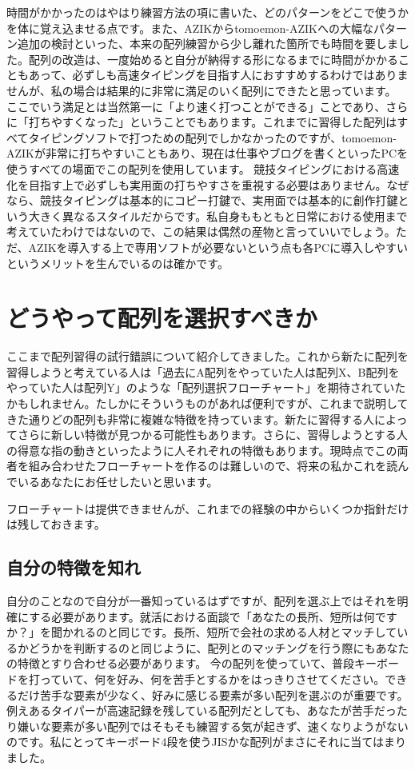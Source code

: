 時間がかかったのはやはり練習方法の項に書いた、どのパターンをどこで使うかを体に覚え込ませる点です。また、AZIKからtomoemon-AZIKへの大幅なパターン追加の検討といった、本来の配列練習から少し離れた箇所でも時間を要しました。配列の改造は、一度始めると自分が納得する形になるまでに時間がかかることもあって、必ずしも高速タイピングを目指す人におすすめするわけではありませんが、私の場合は結果的に非常に満足のいく配列にできたと思っています。
ここでいう満足とは当然第一に「より速く打つことができる」ことであり、さらに「打ちやすくなった」ということでもあります。これまでに習得した配列はすべてタイピングソフトで打つための配列でしかなかったのですが、tomoemon-AZIKが非常に打ちやすいこともあり、現在は仕事やブログを書くといったPCを使うすべての場面でこの配列を使用しています。
競技タイピングにおける高速化を目指す上で必ずしも実用面の打ちやすさを重視する必要はありません。なぜなら、競技タイピングは基本的にコピー打鍵で、実用面では基本的に創作打鍵という大きく異なるスタイルだからです。私自身ももともと日常における使用まで考えていたわけではないので、この結果は偶然の産物と言っていいでしょう。ただ、AZIKを導入する上で専用ソフトが必要ないという点も各PCに導入しやすいというメリットを生んでいるのは確かです。


\section{どうやって配列を選択すべきか}

ここまで配列習得の試行錯誤について紹介してきました。これから新たに配列を習得しようと考えている人は「過去にA配列をやっていた人は配列X、B配列をやっていた人は配列Y」のような「配列選択フローチャート」を期待されていたかもしれません。たしかにそういうものがあれば便利ですが、これまで説明してきた通りどの配列も非常に複雑な特徴を持っています。新たに習得する人によってさらに新しい特徴が見つかる可能性もあります。さらに、習得しようとする人の得意な指の動きといったように人それぞれの特徴もあります。現時点でこの両者を組み合わせたフローチャートを作るのは難しいので、将来の私かこれを読んでいるあなたにお任せしたいと思います。

フローチャートは提供できませんが、これまでの経験の中からいくつか指針だけは残しておきます。

\subsection{自分の特徴を知れ}

自分のことなので自分が一番知っているはずですが、配列を選ぶ上ではそれを明確にする必要があります。就活における面談で「あなたの長所、短所は何ですか？」を聞かれるのと同じです。長所、短所で会社の求める人材とマッチしているかどうかを判断するのと同じように、配列とのマッチングを行う際にもあなたの特徴とすり合わせる必要があります。
今の配列を使っていて、普段キーボードを打っていて、何を好み、何を苦手とするかをはっきりさせてください。できるだけ苦手な要素が少なく、好みに感じる要素が多い配列を選ぶのが重要です。例えあるタイパーが高速記録を残している配列だとしても、あなたが苦手だったり嫌いな要素が多い配列ではそもそも練習する気が起きず、速くなりようがないのです。私にとってキーボード4段を使うJISかな配列がまさにそれに当てはまりました。

